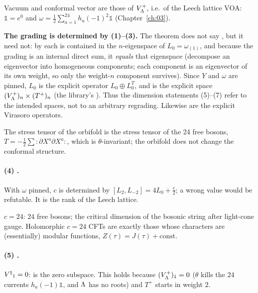 \begin{dictionary}
Vacuum and conformal vector are those of $V_{\Lambda}^+$, i.e.\ of the Leech lattice VOA: $\mathbb 1=e^0$ and
$\omega=\tfrac12\sum_{a=1}^{24}h_a(-1)^2\mathbb 1$ (Chapter~\ref{ch:03}).

\textbf{The grading is determined by (1)--(3).}  The theorem does not say , but
it need not: by  each  is contained in the $n$-eigenspace of
$L_0=\omega_{(1)}$, and because the grading is an internal direct sum, it \emph{equals} that eigenspace
(decompose an eigenvector into homogeneous components; each component is an eigenvector of its own
weight, so only the weight-$n$ component survives).  Since $Y$ and $\omega$ are pinned, $L_0$ is the explicit
operator $L_0\oplus L_0^T$, and  is the explicit space $(V_{\Lambda}^+)_n\times(T^+)_n$
(the library's ).  Thus the dimension statements (5)--(7) refer to the intended spaces,
not to an arbitrary regrading.  Likewise  are the explicit Virasoro operators.
\end{dictionary}

\begin{physics}
The stress tensor of the orbifold is the stress tensor of the 24 free bosons, $T=-\tfrac12\sum:\partial X^a\partial X^a:$,
which is $\theta$-invariant; the orbifold does not change the conformal structure.
\end{physics}

\paragraph{(4) .}  With $\omega$ pinned, $c$ is determined by
$[L_2,L_{-2}]=4L_0+\tfrac c2$; a wrong value would be refutable.  It is the rank of the Leech lattice.

\begin{physics}
$c=24$: 24 free bosons; the critical dimension of the bosonic string after light-cone gauge.
Holomorphic $c=24$ CFTs are exactly those whose characters are (essentially) modular functions,
$Z(\tau)=J(\tau)+\text{const}$.
\end{physics}

\paragraph{(5) .}  ${V^{\natural}}_1=0$:  is the zero subspace.  This holds because
$(V_{\Lambda}^+)_1=0$ ($\theta$ kills the 24 currents $h_a(-1)\mathbb 1$, and ${\Lambda}$ has no roots) and $T^+$ starts in
weight $2$.


